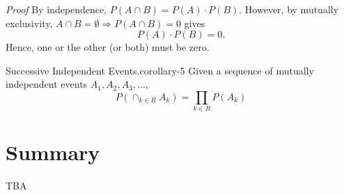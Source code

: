 \documentclass[10pt,]{book}
\makeatletter
\renewcommand*{\proofname}{Proof}
\renewenvironment{proof}[1][\proofname]{\par
  \pushQED{\qed}%
  \normalfont \topsep6\p@\@plus6\p@\relax
  \trivlist
  \item\relax
    {\itshape
    #1\@addpunct{.}}\hspace\labelsep\ignorespaces
}{%
  \popQED\endtrivlist\@endpefalse
}
\numberwithin{equation}{section}
\makeatother
\begin{document}
\begin{proof}\hypertarget{proof-23}{}
\hypertarget{p-602}{}%
By independence, \(P(A \cap B) = P(A) \cdot P(B)\). However, by mutually exclusivity, \(A \cap B = \emptyset \Rightarrow P(A \cap B) = 0\) gives%
\begin{equation*}
P(A) \cdot P(B) = 0.
\end{equation*}
Hence, one or the other (or both) must be zero.%
\end{proof}
%
\par
\hypertarget{p-603}{}%
\begin{corollary}{Successive Independent Events.}{}{corollary-5}%
\hypertarget{p-604}{}%
Given a sequence of mutually independent events \(A_1, A_2, A_3, ...\),%
\begin{equation*}
P(\cap_{k \in R} A_k) = \prod_{k \in R} P(A_k)
\end{equation*}
%
\end{corollary}
%
%
%
\typeout{************************************************}
\typeout{************************************************}
%
\section[{Summary}]{Summary}\label{section-30}
\hypertarget{p-605}{}%
TBA%
%
%
\typeout{************************************************}
\typeout{************************************************}
%
\end{document}
